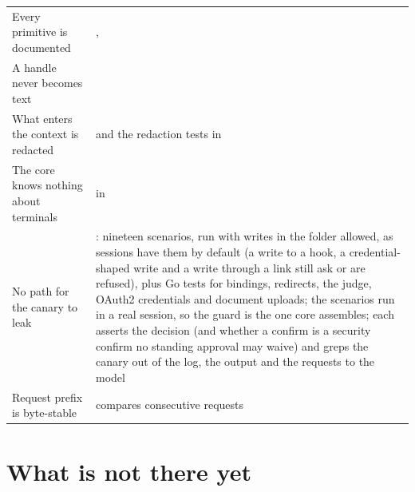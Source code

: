 {\begin{longtable}{@{}L{5.2cm}L{9.8cm}@{}}
Every primitive is documented & ,  \\
A handle never becomes text &  \\
What enters the context is redacted &  and the redaction tests in  \\
The core knows nothing about terminals &  in  \\
No path for the canary to leak & : nineteen scenarios, run with writes in the folder allowed, as sessions have them by default (a write to a hook, a credential-shaped write and a write through a link still ask or are refused), plus Go tests for bindings, redirects, the judge, OAuth2 credentials and document uploads; the scenarios run in a real session, so the guard is the one core assembles; each asserts the decision (and whether a confirm is a security confirm no standing approval may waive) and greps the canary out of the log, the output and the requests to the model \\
Request prefix is byte-stable &  compares consecutive requests \\
\bottomrule
\end{longtable}}

\chapter{What is not there yet}


